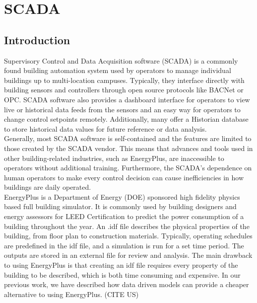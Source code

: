 \section{SCADA}

\subsection{Introduction}

Supervisory Control and Data Acquisition software (SCADA) is a commonly found building automation system used by operators to manage individual buildings up to multi-location campuses. Typically, they interface directly with building sensors and controllers through open source protocols like BACNet or OPC. SCADA software also provides a dashboard interface for operators to view live or historical data feeds from the sensors and an easy way for operators to change control setpoints remotely. Additionally, many offer a Historian database to store historical data values for future reference or data analysis.\\
Generally, most SCADA software is self-contained and the features are limited to those created by the SCADA vendor. This means that advances and tools used in other building-related industries, such as EnergyPlus, are inaccessible to operators without additional training. Furthermore, the SCADA's dependence on human operators to make every control decision can cause inefficiencies in how buildings are daily operated.\\
EnergyPlus is a Department of Energy (DOE) sponsored high fidelity physics based full building simulator. It is commonly used by building designers and energy assessors for LEED Certification to predict the power consumption of a building throughout the year. An .idf file describes the physical properties of the building, from floor plan to construction materials. Typically, operating schedules are predefined in the idf file, and a simulation is run for a set time period. The outputs are stored in an external file for review and analysis. The main drawback to using EnergyPlus is that creating an idf file requires every property of the building to be described, which is both time consuming and expensive. In our previous work, we have described how data driven models can provide a cheaper alternative to using EnergyPlus. (CITE US)
